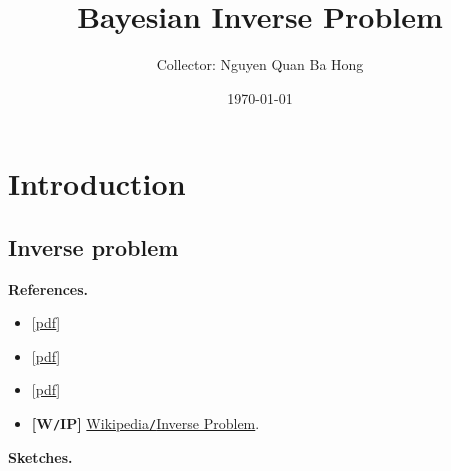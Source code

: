 \documentclass[oneside,11pt]{book}
\title{Bayesian Inverse Problem}
\author{Collector: Nguyen Quan Ba Hong}
\date{\today}
\numberwithin{equation}{section}
\begin{document}
\maketitle
\setcounter{secnumdepth}{6}
\setcounter{tocdepth}{6}
\tableofcontents


\chapter{Introduction}

\section{Inverse problem}
\textbf{References.}
\begin{itemize}
    \item \cite{Aster_Borchers_Thurber2018} [\href{https://github.com/NQBH/reference/blob/master/Aster_Borchers_Thurber2018.pdf}{pdf}]
    \item \cite{Ito_Jin2015} [\href{https://github.com/NQBH/reference/blob/master/Ito_Jin2015.pdf}{pdf}]
    \item \cite{Kirsch2021} [\href{https://github.com/NQBH/reference/blob/master/Kirsch2021.pdf}{pdf}]
    \item \textbf{[W\texttt{/}IP]} \href{https://en.wikipedia.org/wiki/Inverse_problem}{Wikipedia\texttt{/}Inverse Problem}.
\end{itemize}
\textbf{Sketches.}
\end{document}
